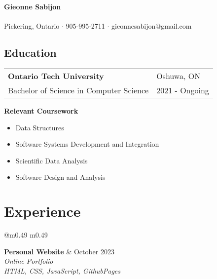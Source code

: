 \documentclass{article}
\begin{document}
\begin{center}
	\Large\textbf{Gieonne Sabijon}\\
	\noindent\hrulefill\\
	{\small Pickering, Ontario $\cdot$ 905-995-2711 $\cdot$ gieonnesabijon@gmail.com}

\end{center}

\begin{center}
	\section*{Education}
\end{center}


\begin{center}
\begin{tabular*}{\textwidth}{@{\extracolsep{\fill}}m{} m{}}
    \textbf{Ontario Tech University} & \hfill Oshuwa, ON \hfill\\
    Bachelor of Science in Computer Science & \hfill 2021 - Ongoing\hfill\\
\end{tabular*}
\begin{flushleft}
\textbf{Relevant Coursework}
	\begin{itemize}
	\item Data Structures
	\item Software Systems Development and Integration 
	\item Scientific Data Analysis
	\item Software Design and Analysis
	\end{itemize}
\end{flushleft}

\section*{Experience}

\begin{tabular*}{\textwidth}{@{\extracolsep{\fill}}m{} m{}}

    \textbf{Personal Website} & \hfill October 2023 \\
    \textit{Online Portfolio}\\
    \textit{HTML, CSS, JavaScript, GithubPages}\\


\end{tabular*}
\end{center}
\end{document}
